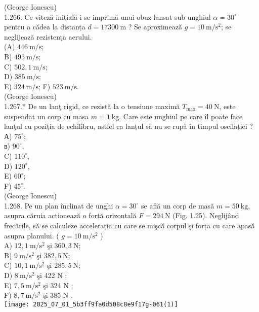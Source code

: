 {(George Ionescu)\\
1.266. Ce viteză inițială i se imprimă unui obuz lansat sub unghiul $\alpha=30^{\circ}$ pentru a cădea la distanța $d=17300 \mathrm{~m}$ ? Se aproximează $g=10 \mathrm{~m} / \mathrm{s}^{2}$; se neglijează rezistența aerului.\\
(A) $446 \mathrm{~m} / \mathrm{s}$;\\
B) $495 \mathrm{~m} / \mathrm{s}$;\\
C) $502,1 \mathrm{~m} / \mathrm{s}$;\\
D) $385 \mathrm{~m} / \mathrm{s}$;\\
E) $324 \mathrm{~m} / \mathrm{s}$; F) $523 \mathrm{~m} / \mathrm{s}$.\\
(George Ionescu)\\
1.267.* De un lanţ rigid, ce rezistă la o tensiune maximă $T_{\max }=40 \mathrm{~N}$, este suspendat un corp cu masa $m=1 \mathrm{~kg}$. Care este unghiul pe care îl poate face lanţul cu poziția de echilibru, astfel ca lanțul să nu se rupă în timpul oscilației ?\\
А) $75^{\circ}$;\\
в) $90^{\circ}$,\\
C) $110^{\circ}$,\\
D) $120^{\circ}$,\\
E) $60^{\circ}$;\\
F) $45^{\circ}$.\\
(George Ionescu)\\
1.268. Pe un plan înclinat de unghi $\alpha=30^{\circ}$ se află un corp de masă $m=50 \mathrm{~kg}$, asupra căruia actionează o forță orizontală $F=294 \mathrm{~N}$ (Fig. 1.25). Neglijând frecările, să se calculeze accelerația cu care se mişcă corpul şi forța cu care apasă asupra planului. ( $g=10 \mathrm{~m} / \mathrm{s}^{2}$ )\\
A) $12,1 \mathrm{~m} / \mathrm{s}^{2}$ şi $360,3 \mathrm{~N}$;\\
B) $9 \mathrm{~m} / \mathrm{s}^{2}$ şi $382,5 \mathrm{~N}$;\\
C) $10,1 \mathrm{~m} / \mathrm{s}^{2}$ şi $285,5 \mathrm{~N}$;\\
D) $8 \mathrm{~m} / \mathrm{s}^{2}$ şi 422 N ;\\
E) $7,5 \mathrm{~m} / \mathrm{s}^{2}$ şi 324 N ;\\
F) $8,7 \mathrm{~m} / \mathrm{s}^{2}$ şi 385 N .\\
\texttt{[image: 2025\_07\_01\_5b3ff9fa0d508c8e9f17g-061(1)]}

}
